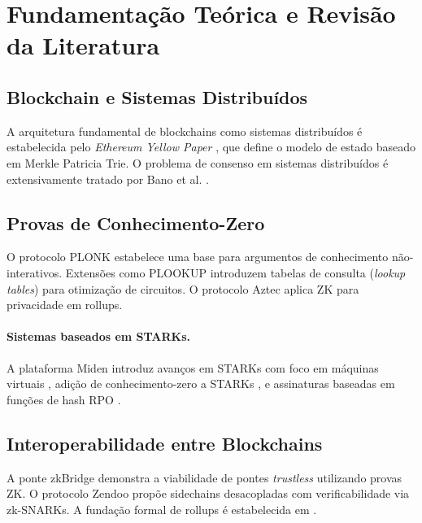\documentclass[12pt,a4paper]{article}
\begin{document}
\section{Fundamentação Teórica e Revisão da Literatura}

\lipsum[14]

\subsection{Blockchain e Sistemas Distribuídos}

A arquitetura fundamental de blockchains como sistemas distribuídos é estabelecida pelo
\textit{Ethereum Yellow Paper} \cite{ethereum_yellow_paper}, que define o modelo de
estado baseado em Merkle Patricia Trie. O problema de consenso em sistemas
distribuídos é extensivamente tratado por Bano et al. \cite{consensus_age_of_blockchains}.

\lipsum[15-16]

\subsection{Provas de Conhecimento-Zero}

O protocolo PLONK \cite{aztec_plonk} estabelece uma base para argumentos de
conhecimento não-interativos. Extensões como PLOOKUP \cite{aztec_plookup}
introduzem tabelas de consulta (\textit{lookup tables}) para otimização de
circuitos. O protocolo Aztec \cite{aztec_protocol_whitepaper} aplica ZK para
privacidade em rollups.

\paragraph{Sistemas baseados em STARKs.} A plataforma Miden introduz avanços em
STARKs com foco em máquinas virtuais \cite{miden_arithmetization_oriented_encryption},
adição de conhecimento-zero a STARKs \cite{miden_adding_zk_to_starks}, e
assinaturas baseadas em funções de hash RPO \cite{miden_stark_signatures_rpo}.

\lipsum[17]

\subsection{Interoperabilidade entre Blockchains}

A ponte zkBridge \cite{zkbridge} demonstra a viabilidade de pontes
\textit{trustless} utilizando provas ZK. O protocolo Zendoo
\cite{zendoo} propõe sidechains desacopladas com verificabilidade via
zk-SNARKs. A fundação formal de rollups é estabelecida em \cite{formal_foundation_blockchain_rollups}.
\end{document}

